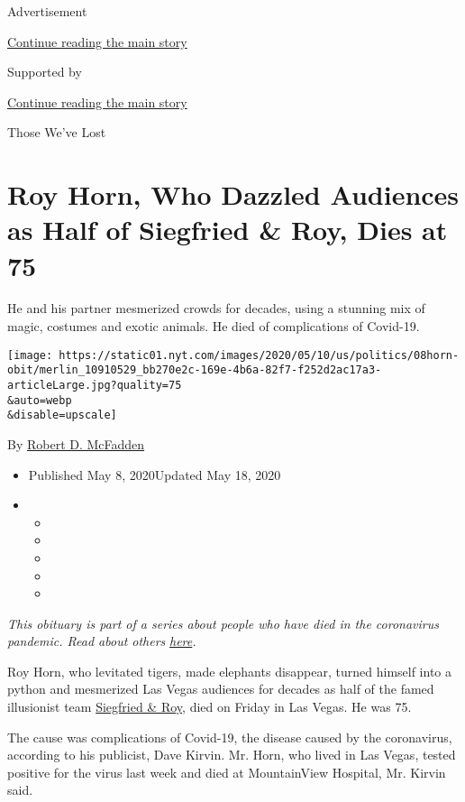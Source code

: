 Advertisement

\protect\hyperlink{after-top}{Continue reading the main story}

Supported by

\protect\hyperlink{after-sponsor}{Continue reading the main story}

Those We've Lost

\hypertarget{roy-horn-who-dazzled-audiences-as-half-of-siegfried--roy-dies-at-75}{%
\section{Roy Horn, Who Dazzled Audiences as Half of Siegfried \& Roy,
Dies at
75}\label{roy-horn-who-dazzled-audiences-as-half-of-siegfried--roy-dies-at-75}}

He and his partner mesmerized crowds for decades, using a stunning mix
of magic, costumes and exotic animals. He died of complications of
Covid-19.

\texttt{[image: https://static01.nyt.com/images/2020/05/10/us/politics/08horn-obit/merlin\_10910529\_bb270e2c-169e-4b6a-82f7-f252d2ac17a3-articleLarge.jpg?quality=75\\\&auto=webp\\\&disable=upscale]}

By \href{https://www.nytimes.com/by/robert-d-mcfadden}{Robert D.
McFadden}

\begin{itemize}
\item
  Published May 8, 2020Updated May 18, 2020
\item
  \begin{itemize}
  \item
  \item
  \item
  \item
  \item
  \end{itemize}
\end{itemize}

\emph{This obituary is part of a series about people who have died in
the coronavirus pandemic. Read about others}
\href{https://www.nytimes.com/series/people-who-have-died-of-the-coronavirus}{\emph{here}}\emph{.}

Roy Horn, who levitated tigers, made elephants disappear, turned himself
into a python and mesmerized Las Vegas audiences for decades as half of
the famed illusionist team \href{http://siegfriedandroy.com/}{Siegfried
\& Roy}, died on Friday in Las Vegas. He was 75.

The cause was complications of Covid-19, the disease caused by the
coronavirus, according to his publicist, Dave Kirvin. Mr. Horn, who
lived in Las Vegas, tested positive for the virus last week and died at
MountainView Hospital, Mr. Kirvin said.

